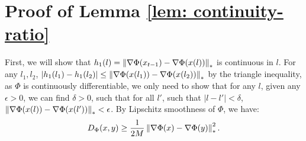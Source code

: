 %
%
%
%


\section{Proof of Lemma \ref{lem: continuity-ratio}}
First, we will show that $h_1(l) = \left\lVert \nabla \Phi(x_{t-1})- \nabla\Phi(x(l)) \right\rVert_*$ is continuous in $l$. For any $l_1, l_2$, $ |h_1(l_1) - h_1(l_2)| \le \left\lVert \nabla \Phi(x(l_1)) - \nabla \Phi(x(l_2))  \right\rVert_*$ by the triangle inequality, as $\Phi$ is continuously differentiable, we only need to show that for any $l$, given any $\epsilon>0$, we can find $\delta>0$, such that for all $l'$, such that $|l - l'|<\delta$, $\left\lVert \nabla \Phi (x(l)) - \nabla \Phi (x(l')) \right\rVert_* <\epsilon$. By Lipschitz smoothness of $\Phi$, we have:
\begin{equation}
D_\Phi(x, y) \ge \frac{1}{2M} \left\lVert \nabla \Phi(x) - \nabla \Phi(y)  \right\rVert_*^2. 
\label{eqn: smoothness-ineq}
\end{equation}

